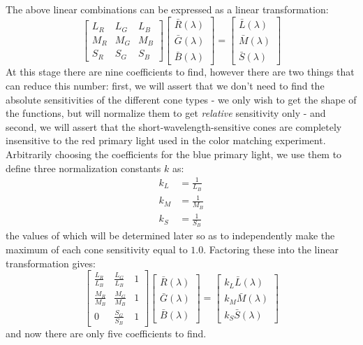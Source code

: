 \documentclass[twocolumn]{article}
\begin{document}
The above linear combinations can be expressed as a linear transformation:
\begin{equation}
    \begin{bmatrix}
        L_R&L_G&L_B\\
        M_R&M_G&M_B\\
        S_R&S_G&S_B
    \end{bmatrix}\begin{bmatrix}
        \bar{R}(\lambda)\\
        \bar{G}(\lambda)\\
        \bar{B}(\lambda)
    \end{bmatrix}=\begin{bmatrix}
        \bar{L}(\lambda)\\
        \bar{M}(\lambda)\\
        \bar{S}(\lambda)
    \end{bmatrix}
\end{equation}
At this stage there are nine coefficients to find, however there are two things that can reduce this number: first, we will assert that we don't need to find the absolute sensitivities of the different cone types - we only wish to get the shape of the functions, but will normalize them to get \textit{relative} sensitivity only - and second, we will assert that the short-wavelength-sensitive cones are completely insensitive to the red primary light used in the color matching experiment.  Arbitrarily choosing the coefficients for the blue primary light, we use them to define three normalization constants $k$ as:
\begin{equation}\label{eq:cone_fundamental_normalization_constants_symbolic}
    \begin{aligned}
        k_L&=\frac{1}{L_B}\\
        k_M&=\frac{1}{M_B}\\
        k_S&=\frac{1}{S_B}
    \end{aligned}
\end{equation}
the values of which will be determined later so as to independently make the maximum of each cone sensitivity equal to $1.0$.  Factoring these into the linear transformation gives:
\begin{equation}\label{eq:cone_fundamental_linear_transformation_symbolic_simplified}
    \begin{bmatrix}
        \frac{L_R}{L_B}&\frac{L_G}{L_B}&1\\
        \frac{M_R}{M_B}&\frac{M_G}{M_B}&1\\
        0&\frac{S_G}{S_B}&1
    \end{bmatrix}\begin{bmatrix}
        \bar{R}(\lambda)\\
        \bar{G}(\lambda)\\
        \bar{B}(\lambda)
    \end{bmatrix}=\begin{bmatrix}
        k_L\bar{L}(\lambda)\\
        k_M\bar{M}(\lambda)\\
        k_S\bar{S}(\lambda)
    \end{bmatrix}
\end{equation}
and now there are only five coefficients to find.
\end{document}
